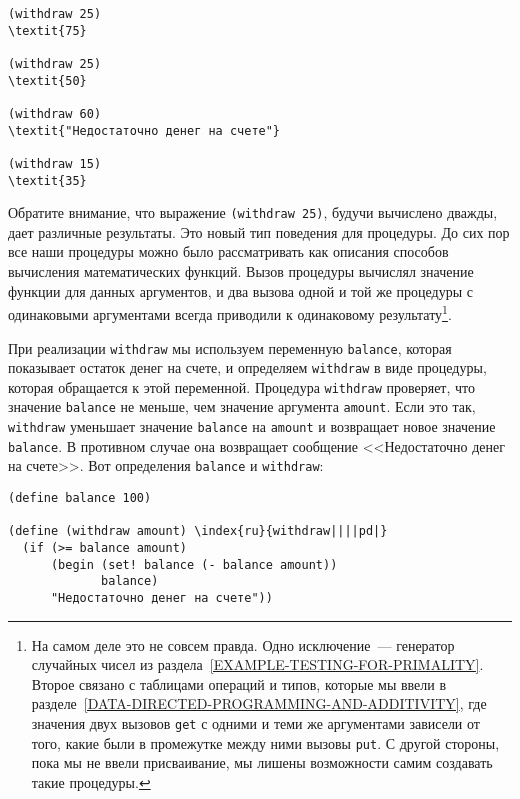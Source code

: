 \begin{Verbatim}[fontsize=\small]
(withdraw 25)
\textit{75}

(withdraw 25)
\textit{50}

(withdraw 60)
\textit{"Недостаточно денег на счете"}

(withdraw 15)
\textit{35}
\end{Verbatim}

Обратите внимание, что выражение {\tt (withdraw 25)}, будучи
вычислено дважды, дает различные результаты.  Это новый тип поведения для
процедуры.  До сих пор все наши процедуры можно было рассматривать как
описания способов вычисления математических функций.  Вызов процедуры
вычислял значение функции для данных аргументов, и два
вызова одной и той же процедуры с одинаковыми аргументами всегда
приводили к одинаковому результату\footnote{На самом деле это не совсем правда.  Одно исключение~--- %
 генератор случайных чисел из
раздела~\ref{EXAMPLE-TESTING-FOR-PRIMALITY}. Второе связано с
таблицами
операций и типов, которые мы ввели в
разделе~\ref{DATA-DIRECTED-PROGRAMMING-AND-ADDITIVITY}, где
значения двух вызовов {\tt get} с одними и теми же аргументами
зависели от того, какие были в промежутке между ними вызовы
{\tt put}.  С другой стороны, пока мы не ввели присваивание,
мы лишены возможности самим создавать такие процедуры.}.

При реализации {\tt withdraw} мы используем
переменную {\tt balance}, которая показывает остаток денег на
счете, и определяем {\tt withdraw} в виде процедуры, которая
обращается к этой переменной.  Процедура {\tt withdraw}
проверяет, что значение {\tt balance} не меньше, чем значение
аргумента {\tt amount}.  Если это так, {\tt withdraw}
уменьшает значение {\tt balance} на {\tt amount} и
возвращает новое значение {\tt balance}.  В противном случае
она возвращает сообщение <<Недостаточно денег на счете>>.  Вот
определения {\tt balance} и {\tt withdraw}:


\begin{Verbatim}[fontsize=\small]
(define balance 100)

(define (withdraw amount) \index{ru}{withdraw||||pd|}
  (if (>= balance amount)
      (begin (set! balance (- balance amount))
             balance)
      "Недостаточно денег на счете"))
\end{Verbatim}

